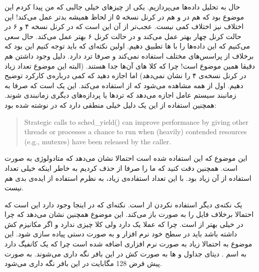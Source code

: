 حال به تحلیل داده‌ها می‌پردازیم. یکی از چیز‌های خیلی جالبی که من پیدا کردم این موضوع بود که
هم در
 و هم 
در کرنل نسخه ۵ از لحاظ
همیشه بدتر عمل می‌کند! این اختلاف نیز اختلاف کمی نیست. عجب‌تر از آن این است که در کرنل نسخه ۴ و ۶ در حالت
کرنل چهار بهتر عمل می‌کند و در حالت
کرنل ۶ بهتر عمل می‌کند. حال سعی می‌کنیم که این داده‌ها را با
ها
تطبیق دهیم. اولین نکته‌ای که باید توجه کنیم این بود که
 برخلاف 
از پراسس‌های مختلف استفاده نمی‌کند و صرفا ترد دارد. دلیل وجود داشتن
هم دقیقا همین موضوع است! چرا که کلا
های
آن‌ها جدا هستند. (البته این موضوع تعداد زیاد  در کرنل نسخه‌ی ۴ را نشان نمی‌دهد)
اما اجازه دهید که کمی درباره‌ی کارکرد
توضیح دهیم. اول از همه مشاهده می‌شود که
از
استفاده می‌کند. این یک
است که صرفا به زمانبند سیستم عامل اجازه می‌دهد که ترد‌ها یا پردازه‌های دیگری زمانبندی شوند. همچنین استفاده از این
یک دلیل خیلی منطقی دارد که در
نوشته شده بود:
\begin{latin}
\begin{quote}
    Strategic calls to sched\_yield() can improve performance by
       giving other threads or processes a chance to run when (heavily)
       contended resources (e.g., mutexes) have been released by the
       caller.
\end{quote}
\end{latin}
این موضوع که این
استفاده شده است احتمالا نشان می‌دهد که متادولوژی
به صورت
است. همچنین دقت کنید که ما
را صرفا از
حذف کردیم به خاطر اینکه خیلی تعداد استفاده از آن زیاد بود. با این تعداد استفاده‌ی زیاد، به نظرم استفاده از
ایده‌ی بدی هم نیست.

یک نکته‌ی دیگر استفاده نکردن از
است. نکته‌ای که در اینجا وجود دارد این است که احتمالا
برخلاف
فایل را به صورت
باز می‌کند. این موضوع همچنین نشان می‌دهد که چرا
 در 
خیلی بهتر از
است. چرا که
عملا یک
دارد ولی
کلا چیزی ندارد و اگر مکانیزم کش داشته باشد باید در سطح خود نرم افزار و به صورت دستی پیاده سازی شود.
این موضوع به احتمالا زیاد به صورت نرم افزاری اضافه شده است چرا که یک کانفیگ
دارد به اسم
.
دیتای جداول و
ها
به صورت کش در این بافر نگه داری می‌شوند. به صورت پیش فرض 128 مگابایت در این بافر نگه داری می‌شود.

